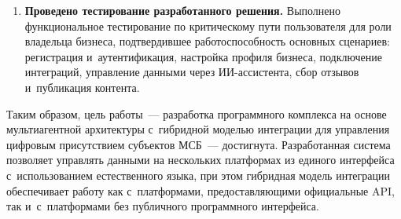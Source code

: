 \begin{enumerate}
  \item \textbf{Проведено тестирование разработанного решения.} Выполнено функциональное тестирование по критическому пути пользователя для роли владельца бизнеса, подтвердившее работоспособность основных сценариев: регистрация и~аутентификация, настройка профиля бизнеса, подключение интеграций, управление данными через ИИ-ассистента, сбор отзывов и~публикация контента.
\end{enumerate}

Таким образом, цель работы~--- разработка программного комплекса на основе мультиагентной архитектуры с~гибридной моделью интеграции для управления цифровым присутствием субъектов МСБ~--- достигнута. Разработанная система позволяет управлять данными на нескольких платформах из единого интерфейса с~использованием естественного языка, при этом гибридная модель интеграции обеспечивает работу как с~платформами, предоставляющими официальные API, так и~с~платформами без публичного программного интерфейса.
